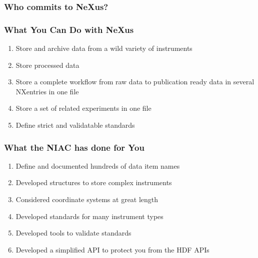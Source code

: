 \documentclass{beamer}
\begin{document}
\begin{frame} \frametitle{Who commits to NeXus? }
\begin{figure}[!ht]
\end{figure}
\end{frame}


\begin{frame} \frametitle{What You Can Do with NeXus}
\begin{enumerate}
\item Store and archive data from a wild variety of instruments
\item Store processed data
\item Store a complete workflow from raw data to publication ready data in several 
 NXentries in one file
\item Store a set of related experiments in one file
\item Define strict and validatable standards 
\end{enumerate}
\end{frame}

\begin{frame} \frametitle{What the NIAC has done for You}
\begin{enumerate}
\item Define and documented hundreds of data item names
\item Developed structures to store complex instruments
\item Considered coordinate systems at great length
\item Developed standards for many instrument types
\item Developed tools to validate standards
\item Developed a simplified API to protect you from the HDF APIs
\end{enumerate}
\end{frame}
\end{document}
